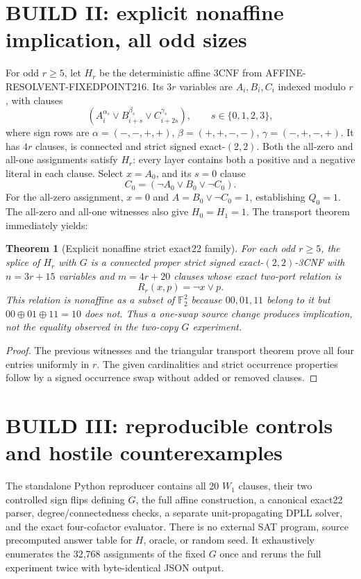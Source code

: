 \documentclass[11pt]{article}
\newtheorem{theorem}{Theorem}
\begin{document}
\section{BUILD II: explicit nonaffine implication, all odd sizes}
For odd $r\ge5$, let $H_r$ be the deterministic affine 3CNF from AFFINE-RESOLVENT-FIXEDPOINT216. Its $3r$ variables are $A_i,B_i,C_i$ indexed modulo $r$, with clauses
\[
 (A_i^{\alpha_s}\vee B_{i+s}^{\beta_s}\vee C_{i+2s}^{\gamma_s}),
 \qquad s\in\{0,1,2,3\},
\]
where sign rows are $\alpha=(-,-,+,+)$, $\beta=(+,+,-,-)$, $\gamma=(-,+,-,+)$. It has $4r$ clauses, is connected and strict signed exact-$(2,2)$. Both the all-zero and all-one assignments satisfy $H_r$: every layer contains both a positive and a negative literal in each clause. Select $x=A_0$, and its $s=0$ clause
\[
 C_0=(\neg A_0\vee B_0\vee\neg C_0).
\]
For the all-zero assignment, $x=0$ and $A=B_0\vee\neg C_0=1$, establishing $Q_0=1$. The all-zero and all-one witnesses also give $H_0=H_1=1$. The transport theorem immediately yields:
\begin{theorem}[Explicit nonaffine strict exact22 family]
For each odd $r\ge5$, the splice of $H_r$ with $G$ is a connected proper strict signed exact-$(2,2)$-3CNF with $n=3r+15$ variables and $m=4r+20$ clauses whose exact two-port relation is
\[
 R_r(x,p)=\neg x\lor p.
\]
This relation is nonaffine as a subset of $\mathbb F_2^2$ because $00,01,11$ belong to it but $00\oplus01\oplus11=10$ does not. Thus a one-swap source change produces implication, not the equality observed in the two-copy $G$ experiment.
\end{theorem}
\begin{proof}The previous witnesses and the triangular transport theorem prove all four entries uniformly in $r$. The given cardinalities and strict occurrence properties follow by a signed occurrence swap without added or removed clauses.\end{proof}

\section{BUILD III: reproducible controls and hostile counterexamples}
The standalone Python reproducer contains all 20 $W_1$ clauses, their two controlled sign flips defining $G$, the full affine construction, a canonical exact22 parser, degree/connectedness checks, a separate unit-propagating DPLL solver, and the exact four-cofactor evaluator. There is no external SAT program, source precomputed answer table for $H$, oracle, or random seed. It exhaustively enumerates the 32,768 assignments of the fixed $G$ once and reruns the full experiment twice with byte-identical JSON output.
\end{document}
